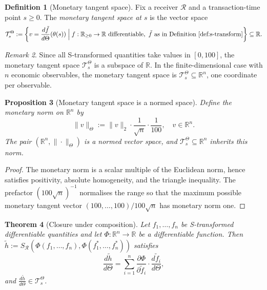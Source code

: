 \documentclass[twocolumn,11pt,a4paper]{article}
\theoremstyle{thmstyle}
\newtheorem{theorem}{Theorem}[section]
\newtheorem{proposition}[theorem]{Proposition}
\theoremstyle{definition}
\newtheorem{definition}[theorem]{Definition}
\theoremstyle{remark}
\newtheorem{remark}[theorem]{Remark}
\newcommand{\Clock}{\Theta}                  %
\newcommand{\InvClock}{\theta}               %
\newcommand{\Mdiff}[1]{\frac{d#1}{d\Clock}} %
\newcommand{\Sval}{S}                        %
\newcommand{\Mtan}{\mathcal{T}^{\Clock}}     %
\newcommand{\Real}{\mathbb{R}}
\begin{document}
\begin{definition}[Monetary tangent space]\label{def:tangent}
Fix a receiver $\mathcal{R}$ and a transaction-time point
$s\geq 0$.  The \emph{monetary tangent space at $s$} is
the vector space
\begin{equation}
  \Mtan_{s} := \left\{
    v = \Mdiff{\tilde{f}}(\InvClock(s))
    \;\Big|\;
    f:\Real_{\geq 0}\to\Real\ \text{differentiable},\
    \tilde{f}\ \text{as in Definition~\ref{def:s-transform}}
  \right\} \subseteq \Real.
\end{equation}
\end{definition}

\begin{remark}\label{rem:tangent-is-real}
Since all S-transformed quantities take values in $[0,100]$,
the monetary tangent space $\Mtan_{s}$ is a subspace of
$\Real$.  In the finite-dimensional case with $n$ economic
observables, the monetary tangent space is $\Mtan_{s}
\subseteq \Real^{n}$, one coordinate per observable.
\end{remark}

\begin{proposition}[Monetary tangent space is a normed space]
\label{prop:normed-tangent}
Define the \emph{monetary norm} on $\Real^{n}$ by
\begin{equation}\label{eq:mnorm}
  \|v\|_{\Clock}
  := \|v\|_{2}
     \cdot \frac{1}{\sqrt{n}}\cdot\frac{1}{100},
  \quad v\in\Real^{n}.
\end{equation}
The pair $(\Real^{n}, \|\cdot\|_{\Clock})$ is a normed
vector space, and $\Mtan_{s}\subseteq\Real^{n}$ inherits
this norm.
\end{proposition}

\begin{proof}
The monetary norm is a scalar multiple of the Euclidean
norm, hence satisfies positivity, absolute homogeneity,
and the triangle inequality.  The prefactor
$(100\sqrt{n})^{-1}$ normalises the range so that the
maximum possible monetary tangent vector
$(100,\ldots,100)/100\sqrt{n}$ has monetary norm one.
\end{proof}

\begin{theorem}[Closure under composition]\label{thm:closure}
Let $f_{1},\ldots,f_{n}$ be S-transformed differentiable
quantities and let $\Phi:\Real^{n}\to\Real$ be a
differentiable function.  Then
$\tilde{h} := \Sval_{\mathcal{R}}(\Phi(f_{1},\ldots,f_{n}),
\Phi(f^{*}_{1},\ldots,f^{*}_{n}))$ satisfies
\begin{equation}
  \Mdiff{\tilde{h}}
  = \sum_{i=1}^{n}
    \frac{\partial\Phi}{\partial\tilde{f}_{i}}
    \cdot\Mdiff{\tilde{f}_{i}},
\end{equation}
and $\Mdiff{\tilde{h}}\in\Mtan_{s}$.
\end{theorem}
\end{document}
